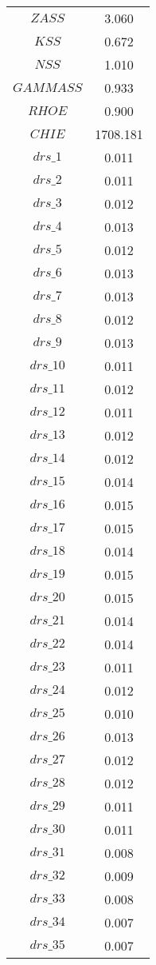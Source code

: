 \begin{center}
\begin{longtable}{cc}
$ZASS$ 	 & 	 3.060 \\
$KSS$ 	 & 	 0.672 \\
$NSS$ 	 & 	 1.010 \\
$GAMMASS$ 	 & 	 0.933 \\
$RHOE$ 	 & 	 0.900 \\
$CHIE$ 	 & 	 1708.181 \\
$drs\_1$ 	 & 	 0.011 \\
$drs\_2$ 	 & 	 0.011 \\
$drs\_3$ 	 & 	 0.012 \\
$drs\_4$ 	 & 	 0.013 \\
$drs\_5$ 	 & 	 0.012 \\
$drs\_6$ 	 & 	 0.013 \\
$drs\_7$ 	 & 	 0.013 \\
$drs\_8$ 	 & 	 0.012 \\
$drs\_9$ 	 & 	 0.013 \\
$drs\_10$ 	 & 	 0.011 \\
$drs\_11$ 	 & 	 0.012 \\
$drs\_12$ 	 & 	 0.011 \\
$drs\_13$ 	 & 	 0.012 \\
$drs\_14$ 	 & 	 0.012 \\
$drs\_15$ 	 & 	 0.014 \\
$drs\_16$ 	 & 	 0.015 \\
$drs\_17$ 	 & 	 0.015 \\
$drs\_18$ 	 & 	 0.014 \\
$drs\_19$ 	 & 	 0.015 \\
$drs\_20$ 	 & 	 0.015 \\
$drs\_21$ 	 & 	 0.014 \\
$drs\_22$ 	 & 	 0.014 \\
$drs\_23$ 	 & 	 0.011 \\
$drs\_24$ 	 & 	 0.012 \\
$drs\_25$ 	 & 	 0.010 \\
$drs\_26$ 	 & 	 0.013 \\
$drs\_27$ 	 & 	 0.012 \\
$drs\_28$ 	 & 	 0.012 \\
$drs\_29$ 	 & 	 0.011 \\
$drs\_30$ 	 & 	 0.011 \\
$drs\_31$ 	 & 	 0.008 \\
$drs\_32$ 	 & 	 0.009 \\
$drs\_33$ 	 & 	 0.008 \\
$drs\_34$ 	 & 	 0.007 \\
$drs\_35$ 	 & 	 0.007 \\

\end{longtable}
\end{center}
